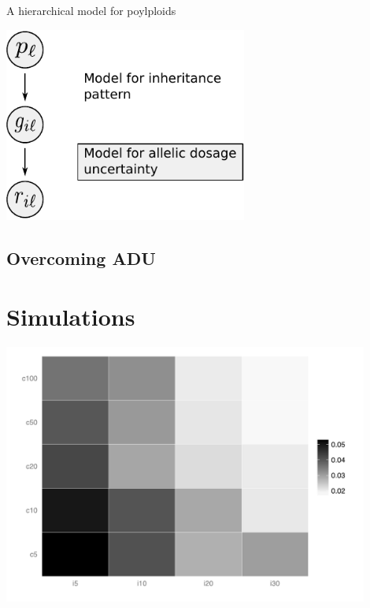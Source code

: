 \documentclass[t,presentation,10pt]{beamer}
\begin{document}
\begin{frame}[c]{A hierarchical model for poylploids}
	\begin{center}
		\includegraphics[width=0.6\textwidth]{fig/figure1-model-graph}
	\end{center}
\end{frame}

\subsection{Overcoming ADU}

\section{Simulations}

\begin{frame}[c,plain]{}
	\begin{center}
		\includegraphics[width=0.9\textwidth]{fig/hex-plot0-05}
	\end{center}
\end{frame}
\end{document}
